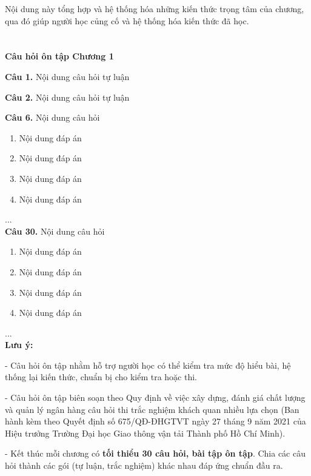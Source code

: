 Nội dung này tổng hợp và hệ thống hóa những kiến thức trọng tâm của chương, qua đó giúp người học củng cố và hệ thống hóa kiến thức đã học.

\newpage

\section*{}
\begin{center}
	\bfseries\fontsize{12}{14}\selectfont
	Câu hỏi ôn tập Chương 1
\end{center}

\noindent\textbf{Câu 1.} Nội dung câu hỏi tự luận

\noindent\textbf{Câu 2.} Nội dung câu hỏi tự luận

\noindent\textbf{Câu 6.} Nội dung câu hỏi
\begin{enumerate}[label=\Alph*.]
\item Nội dung đáp án
\item Nội dung đáp án
\item Nội dung đáp án
\item Nội dung đáp án
\end{enumerate}
...\\
\noindent\textbf{Câu 30.} Nội dung câu hỏi
\begin{enumerate}[label=\Alph*.]
\item Nội dung đáp án
\item Nội dung đáp án
\item Nội dung đáp án
\item Nội dung đáp án
\end{enumerate}
...\\
\noindent\textbf{Lưu ý:}

- Câu hỏi ôn tập nhằm hỗ trợ người học có thể kiểm tra mức độ hiểu bài, hệ thống lại kiến thức, chuẩn bị cho kiểm tra hoặc thi.

- Câu hỏi ôn tập biên soạn theo Quy định về việc xây dựng, đánh giá chất lượng và quản lý ngân hàng câu hỏi thi trắc nghiệm khách quan nhiều lựa chọn (Ban hành kèm theo Quyết định số 675/QĐ-ĐHGTVT ngày 27 tháng 9 năm 2021 của Hiệu trưởng Trường Đại học Giao thông vận tải Thành phố Hồ Chí Minh).

- Kết thúc mỗi chương có \textbf{tối thiểu 30 câu hỏi, bài tập ôn tập}. Chia các câu hỏi  thành các gói (tự luận, trắc nghiệm) khác nhau đáp ứng chuẩn đầu ra.


